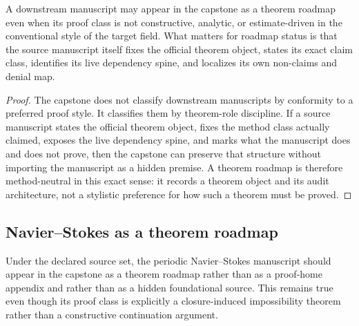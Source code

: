 \begin{proposition}
\label{prop:method-neutral-roadmaps}
A downstream manuscript may appear in the capstone as a theorem roadmap even when its proof class is not constructive, analytic, or estimate-driven in the conventional style of the target field. What matters for roadmap status is that the source manuscript itself fixes the official theorem object, states its exact claim class, identifies its live dependency spine, and localizes its own non-claims and denial map.
\end{proposition}

\begin{proof}
The capstone does not classify downstream manuscripts by conformity to a preferred proof style. It classifies them by theorem-role discipline. If a source manuscript states the official theorem object, fixes the method class actually claimed, exposes the live dependency spine, and marks what the manuscript does and does not prove, then the capstone can preserve that structure without importing the manuscript as a hidden premise. A theorem roadmap is therefore method-neutral in this exact sense: it records a theorem object and its audit architecture, not a stylistic preference for how such a theorem must be proved.
\end{proof}

\subsection{Navier--Stokes as a theorem roadmap}

\begin{proposition}
Under the declared source set, the periodic Navier--Stokes manuscript should appear in the capstone as a theorem roadmap rather than as a proof-home appendix and rather than as a hidden foundational source. This remains true even though its proof class is explicitly a closure-induced impossibility theorem rather than a constructive continuation argument.
\end{proposition}

